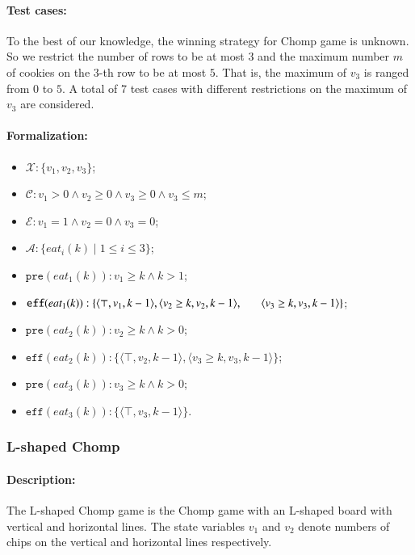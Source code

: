 \documentclass[review]{elsarticle}
\newcommand{\set}[1]{\{ #1 \}}
\newcommand{\tuple}[1]{\langle {#1} \rangle}
\newcommand{\true}{\top}
\newcommand{\statevar}{\mathcal{X}}
\newcommand{\act}{\mathcal{A}}
\newcommand{\constraint}{\mathcal{C}}
\newcommand{\estate}{\mathcal{E}}
\newcommand{\pre}{\mathtt{pre}}
\newcommand{\eff}{\mathtt{eff}}
\begin{document}
\paragraph{Test cases:}
To the best of our knowledge, the winning strategy for Chomp game is unknown.
So we restrict the number of rows to be at most $3$ and the maximum number $m$ of cookies on the $3$-th row to be at most $5$.
That is, the maximum of $v_3$ is ranged from $0$ to $5$.
A total of 7 test cases with different restrictions on the maximum of $v_3$ are considered.
\paragraph{Formalization:}
\begin{itemize}
	\item $\statevar: \set{v_1, v_2, v_3}$;
	\item $\constraint: v_1 > 0 \wedge  v_2 \ge 0 \wedge  v_3 \ge 0 \wedge v_3 \le m$;
	\item $\estate: v_1 = 1 \wedge  v_2 = 0 \wedge v_3=0$;
	\item $\act:\set{eat_i(k){\mid}1 \le i \le 3}$;
	\item $\pre(eat_1(k)) : v_1 \ge k \wedge k > 1$;
	\item $\eff(eat_1(k)) : \set{\tuple{\true,v_1,k-1}, \tuple{v_2 \ge k,v_2,k-1},\\ \hspace*{6mm}
		\tuple{v_3 \ge k,v_3 ,k-1}}$;
	\item $\pre(eat_2(k)) : v_2 \ge k \wedge  k > 0$;
	\item $\eff(eat_2(k)) :  \set{\tuple{\true,v_2,k-1}, \tuple{v_3 \ge k,v_3 ,k-1}}$;
	\item $\pre(eat_3(k)) : v_3 \ge k \wedge  k > 0$;
	\item $\eff(eat_3(k)) :  \set{\tuple{\true,v_3,k-1}}$.
\end{itemize}




\subsubsection{L-shaped Chomp \protect\cite{Sch1952}}

\paragraph{Description:}  
The L-shaped Chomp game is the Chomp game with an L-shaped board with vertical and horizontal lines. 
The state variables $ v_1$ and $v_2$ denote numbers of chips on the vertical and horizontal lines respectively.
\end{document}
